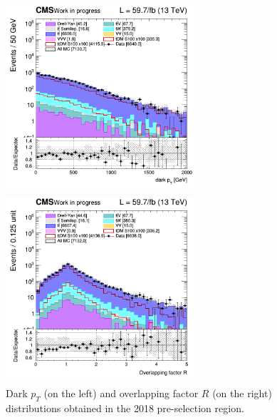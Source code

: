 \documentclass[a4paper, 10pt, openright]{report}
\begin{document}
\begin{figure}[htbp]
\centering
\begin{minipage}[b]{.47\textwidth}
\includegraphics[width=7cm, height=7cm]{figs/2018/SmearSR-ttDM-scalar100/log_cratio_topCR_ll_dark_pt.png}
\end{minipage}\hfill
\begin{minipage}[b]{.47\textwidth}
\includegraphics[width=7cm, height=7cm]{figs/2018/SmearSR-ttDM-scalar100/log_cratio_topCR_ll_overlapping_factor.png}
\end{minipage}\hfill
\caption{Dark $p_T$ (on the left) and overlapping factor $R$ (on the right) distributions obtained in the 2018 pre-selection region.}
\label{fig:SRdisc1}
\end{figure}
\end{document}
